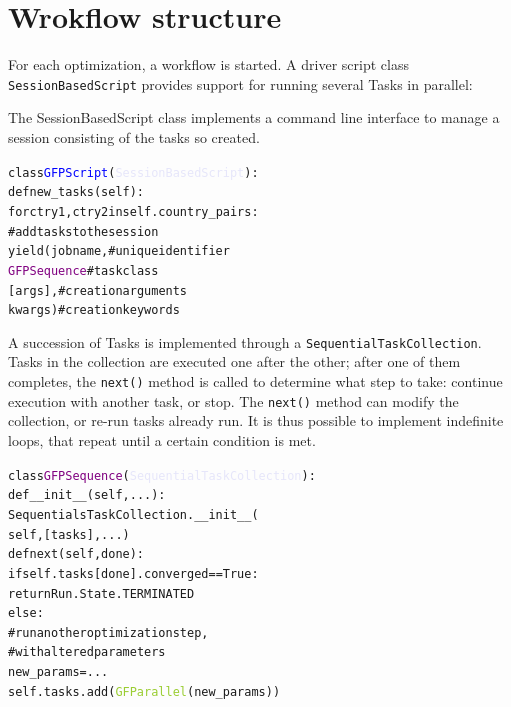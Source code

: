 \documentclass{PoS}
\begin{document}
\section{Wrokflow structure}
For each optimization, a workflow is started. A driver script class
\texttt{SessionBasedScript} provides support for running several Tasks
in parallel:

The SessionBasedScript class implements a command line interface to
manage a session consisting of the tasks so created.

\begin{center}
  \begin{minipage}{0.5\linewidth}
\begin{alltt}
class \textcolor{blue}{GFPScript}(\textcolor{Lavender}{SessionBasedScript}):
  def new_tasks(self):
    for ctry1, ctry2 in self.country_pairs:
      # add tasks to the session
      yield (jobname,# unique identifier 
             \textcolor{Purple}{GFPSequence}  # task class
             [ args ],  # creation arguments 
             { kwargs })# creation keywords
\end{alltt}
    \end{minipage}
  \end{center}

A succession of Tasks is implemented through a
\texttt{SequentialTaskCollection}. Tasks in the collection are
executed one after the other; after one of them completes, the
\texttt{next()} method is called to determine what step to take:
continue execution with another task, or stop. The \texttt{next()}
method can modify the collection, or re-run tasks already run. It is
thus possible to implement indefinite loops, that repeat until a
certain condition is met. 

\begin{center}
  \begin{minipage}{0.5\linewidth}
\begin{alltt}
class  \textcolor{Purple}{GFPSequence}(\textcolor{Lavender}{SequentialTaskCollection}):
  def __init__(self, ...):
    SequentialsTaskCollection.__init__(
      self, [ tasks ], ...)
  def next(self, done):
    if self.tasks[done].converged == True:
      return Run.State.TERMINATED
    else:
      # run another optimization step,
      # with altered parameters
      new_params = ...
      self.tasks.add( \textcolor{YellowGreen}{GFParallel}(new_params))
\end{alltt}
  \end{minipage}
\end{center}
\end{document}
